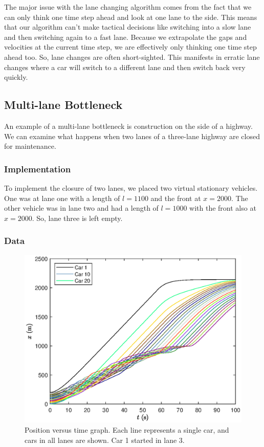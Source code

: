 \documentclass[12pt]{article}
\begin{document}
    The major issue with the lane changing algorithm comes from the fact that we can only think one time step ahead and look at one lane to the side. This means that our algorithm can't make tactical decisions like switching into a slow lane and then switching again to a fast lane. Because we extrapolate the gaps and velocities at the current time step, we are effectively only thinking one time step ahead too. So, lane changes are often short-sighted. This manifests in erratic lane changes where a car will switch to a different lane and then switch back very quickly. 
    
    \subsection{Multi-lane Bottleneck}\label{multi lane bottleneck}
    An example of a multi-lane bottleneck is construction on the side of a highway. We can examine what happens when two lanes of a three-lane highway are closed for maintenance. 
    \subsubsection{Implementation}
    To implement the closure of two lanes, we placed two virtual stationary vehicles. One was at lane one with a length of $l=1100$ and the front at $x=2000$. The other vehicle was in lane two and had a length of $l=1000$ with the front also at $x=2000$. So, lane three is left empty.
    \subsubsection{Data}

    \begin{figure}[H]
      \begin{center}
        \includegraphics[width=13cm]{mlbn_x.eps}
        \caption{Position versus time graph. Each line represents a single car, and cars in all lanes are shown. Car 1 started in lane 3.}
        \label{fig:multi lane x}
      \end{center}
    \end{figure}
\end{document}

